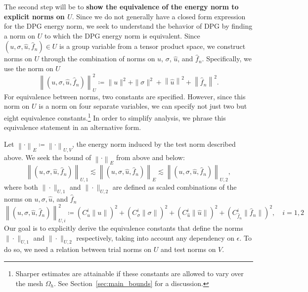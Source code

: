 \documentclass[11pt,onecolumn]{scrartcl}
\newcommand{\eqnlab}[1]{\label{eq:#1}}
\newcommand{\nor}[1]{\left\| #1 \right\|}
\newcommand{\Oh}{\Omega_h}
\begin{document}
The second step will be to \textbf{show the equivalence of the energy norm to explicit norms on $U$}. Since we do not generally have a closed form expression for the DPG energy norm, we seek to understand the behavior of DPG by finding a norm on $U$ to which the DPG energy norm is equivalent. Since $\left(u,\sigma,\widehat{u},\widehat{f}_n\right)\in U$ is a group variable from a tensor product space, we construct norms on $U$ through the combination of norms on $u$, $\sigma$, $\widehat{u}$, and $\widehat{f}_n$. Specifically, we use the norm on $U$ 
\begin{equation}
\left\| \left(u,\sigma,\widehat{u},\widehat{f}_n\right)\right \|_{U}^2 \coloneqq \|u\|^2 + \|\sigma\|^2 + \left\|\widehat{u}\right\|^2 + \left\|\widehat{f}_n\right\|^2.
\end{equation}
For equivalence between norms, two constants are specified. However, since this norm on $U$ is a norm on four separate variables, we can specify not just two but eight equivalence constants.\footnote{Sharper estimates are attainable if these constants are allowed to vary over the mesh $\Oh$. See Section~\ref{sec:main_bounds} for a discussion.} In order to simplify analysis, we phrase this equivalence statement in an alternative form. 

Let $\nor{\cdot}_E \coloneqq \nor{\cdot}_{U,V}$, the energy norm induced by the test norm described above. We seek the bound of $\nor{\cdot}_E$ from above and below:
\[
\left\| \left(u,\sigma,\widehat{u},\widehat{f}_n\right)\right \|_{U,1} \lesssim  \left\| \left(u,\sigma,\widehat{u},\widehat{f}_n\right)\right \|_E \lesssim \left\| \left(u,\sigma,\widehat{u},\widehat{f}_n\right)\right \|_{U,2},
\]
where both $\|\cdot\|_{U,1}$ and $\|\cdot\|_{U,2}$ are defined as scaled combinations of the norms on $u, \sigma, \widehat{u}$, and $\widehat{f}_n$
\begin{equation}
\eqnlab{uNorms}
\left\| \left(u,\sigma,\widehat{u},\widehat{f}_n\right)\right \|_{U,i}^2 \coloneqq \left(C_u^i\|u\|\right)^2 + \left(C_\sigma^i\|\sigma\|\right)^2 + \left(C_{\widehat{u}}^i\|\widehat{u}\|\right)^2 + \left(C_{\widehat{f}_n}^i\|\widehat{f}_n\|\right)^2,\quad i = 1,2
\end{equation}
Our goal is to explicitly derive the equivalence constants 
that define the norms $\|\cdot\|_{U,1}$ and $\|\cdot\|_{U,2}$ respectively, taking into account any dependency on $\epsilon$. To do so, we need a relation between trial norms on $U$ and test norms on $V$.
\end{document}
